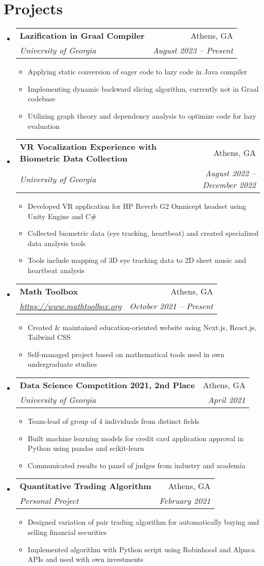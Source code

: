 \documentclass[letterpaper,11pt]{article}
\makeatletter
\newcommand{\resumeItem}[1]{
  \item\small{#1}
}
\newcommand{\resumeSubheading}[4]{
  \vspace{-1pt}\item
    \begin{tabular*}{0.97\textwidth}[t]{l@{\extracolsep{\fill}}r}
      \textbf{#1} & #2 \\
      \textit{\small#3} & \textit{\small #4} \\
    \end{tabular*}\vspace{-7pt}
}
\newcommand{\resumeSubHeadingListStart}{\begin{itemize}[leftmargin=*]}
\newcommand{\resumeSubHeadingListEnd}{\end{itemize}}
\newcommand{\resumeItemListStart}{\begin{itemize}}
\newcommand{\resumeItemListEnd}{\end{itemize}\vspace{-10pt}}
\makeatother
\begin{document}
\section{Projects}
\resumeSubHeadingListStart

 
  \resumeSubheading{Lazification in Graal Compiler}{Athens, GA}{University of Georgia}{August 2023 -- Present}
  \resumeItemListStart
  \resumeItem{Applying static conversion of eager code to lazy code in Java compiler}
\resumeItem{Implementing dynamic backward slicing algorithm, currently not in Graal codebase}
\resumeItem{Utilizing graph theory and dependency analysis to optimize code for lazy evaluation}
  \resumeItemListEnd
  
 
  \resumeSubheading{VR Vocalization Experience with Biometric Data Collection}{Athens, GA}{University of Georgia}{August 2022 -- December 2022}
  \resumeItemListStart
  \resumeItem{Developed VR application for HP Reverb G2 Omnicept headset using Unity Engine and C\#}
\resumeItem{Collected biometric data (eye tracking, heartbeat) and created specialized data analysis tools}
\resumeItem{Tools include mapping of 3D eye tracking data to 2D sheet music and heartbeat analysis}
  \resumeItemListEnd
  

 
  \resumeSubheading{Math Toolbox}{Athens, GA}{\href{https://www.mathtoolbox.org}{https://www.mathtoolbox.org}}{October 2021 -- Present}
  \resumeItemListStart
  \resumeItem{Created \& maintained education-oriented website using Next.js, React.js, Tailwind CSS}
\resumeItem{Self-managed project based on mathematical tools used in own undergraduate studies}
  \resumeItemListEnd
  
 
  \resumeSubheading{Data Science Competition 2021, 2nd Place}{Athens, GA}{University of Georgia}{April 2021}
  \resumeItemListStart
  \resumeItem{Team-lead of group of 4 individuals from distinct fields}
\resumeItem{Built machine learning models for credit card application approval in Python using pandas and scikit-learn}
\resumeItem{Communicated results to panel of judges from industry and academia}
  \resumeItemListEnd
  
 
  \resumeSubheading{Quantitative Trading Algorithm}{Athens, GA}{Personal Project}{February 2021}
  \resumeItemListStart
  \resumeItem{Designed variation of pair trading algorithm for automatically buying and selling financial securities}
\resumeItem{Implemented algorithm with Python script using Robinhood and Alpaca APIs and used with own investments}
  \resumeItemListEnd
  \resumeSubHeadingListEnd
\end{document}
